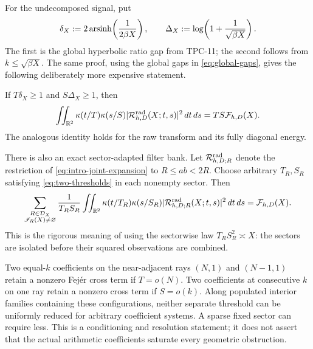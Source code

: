 For the undecomposed signal, put
\begin{equation}
 \delta_X:=2\operatorname{arsinh}\!\left(\frac1{2\beta X}\right),
 \qquad
 \Delta_X:=\log\!\left(1+\frac1{\sqrt{\beta X}}\right).
 \label{eq:global-gaps}
\end{equation}
The first is the global hyperbolic ratio gap from TPC-11; the second
follows from $k\leq\sqrt{\beta X}$.  The same proof, using the global
gaps in \eqref{eq:global-gaps}, gives the following deliberately more
expensive statement.

\begin{corollary}
\label{cor:global-radial-Parseval}
If $T\delta_X\geq1$ and $S\Delta_X\geq1$, then
\begin{equation}
 \iint_{\mathbb R^2}\kappa(t/T)\kappa(s/S)
 |\mathcal R^{\mathrm{rad}}_{h,D}(X;t,s)|^2\,dt\,ds
 =TS\mathcal F_{h,D}(X).
 \label{eq:global-radial-Parseval}
\end{equation}
The analogous identity holds for the raw transform and its fully
diagonal energy.
\end{corollary}

There is also an exact sector-adapted filter bank.  Let
$\mathcal R^{\mathrm{rad}}_{h,D;R}$ denote the restriction of
\eqref{eq:intro-joint-expansion} to $R\leq ab<2R$.  Choose arbitrary
$T_R,S_R$ satisfying \eqref{eq:two-thresholds} in each nonempty sector.
Then
\begin{equation}
 \sum_{\substack{R\in\mathcal D_X\\\mathscr I_R(X)\ne\varnothing}}
 \frac1{T_RS_R}
 \iint_{\mathbb R^2}\kappa(t/T_R)\kappa(s/S_R)
 |\mathcal R^{\mathrm{rad}}_{h,D;R}(X;t,s)|^2\,dt\,ds
 =\mathcal F_{h,D}(X).
 \label{eq:multiresolution-Parseval}
\end{equation}
This is the rigorous meaning of using the sectorwise law
$T_RS_R^2\asymp X$: the sectors are isolated before their
squared observations are combined.

\begin{remark}
Two equal-$k$ coefficients on the near-adjacent rays $(N,1)$ and
$(N-1,1)$ retain a nonzero Fej\'er cross term if $T=o(N)$.  Two
coefficients at consecutive $k$ on one ray retain a nonzero cross term
if $S=o(k)$.  Along populated interior families containing these
configurations, neither separate threshold can be uniformly reduced for
arbitrary coefficient systems.  A sparse fixed sector can require less.
This is a conditioning and resolution statement; it does not assert that
the actual arithmetic coefficients saturate every geometric obstruction.
\end{remark}
